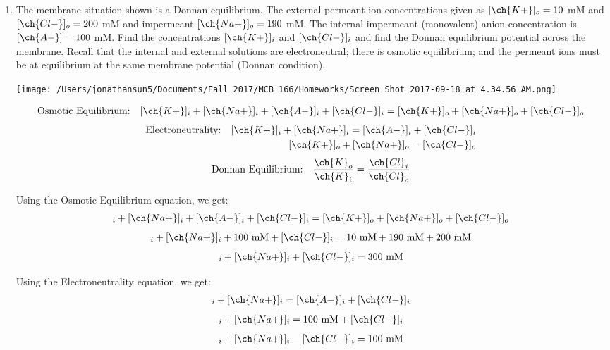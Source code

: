 \documentclass[11pt]{article}
\begin{document}
\begin{enumerate}[label=\arabic*.]
\newpage
\item
The membrane situation shown is a Donnan equilibrium. The external permeant ion concentrations given as $[\ch{K+}]_o = 10$ mM and $[\ch{Cl-}]_o = 200$ mM and impermeant $[\ch{Na+}]_o = 190$ mM. The internal impermeant (monovalent) anion concentration is $[\ch{A-}] = 100$ mM. Find the concentrations $[\ch{K+}]_i$ and $[\ch{Cl-}]_i$ and find the Donnan equilibrium potential across the membrane. Recall that the internal and external solutions are electroneutral; there is osmotic equilibrium; and the permeant ions must be at equilibrium at the same membrane potential (Donnan condition).
\begin{center}
\texttt{[image: /Users/jonathansun5/Documents/Fall 2017/MCB 166/Homeworks/Screen Shot 2017-09-18 at 4.34.56 AM.png]}
\end{center}
\begin{align*}
\text{Osmotic Equilibrium:} && [\ch{K+}]_i + [\ch{Na+}]_i + [\ch{A-}]_i + [\ch{Cl-}]_i = [\ch{K+}]_o + [\ch{Na+}]_o + [\ch{Cl-}]_o
\end{align*}
\begin{align*}
\text{Electroneutrality:} && [\ch{K+}]_i + [\ch{Na+}]_i = [\ch{A-}]_i + [\ch{Cl-}]_i \\
&& [\ch{K+}]_o + [\ch{Na+}]_o = [\ch{Cl-}]_o
\end{align*}
\begin{align*}
\text{Donnan Equilibrium:} &&  \frac{\ch{K}_o} {\ch{K}_i} = \frac{\ch{Cl}_i} {\ch{Cl}_o}
\end{align*}

Using the Osmotic Equilibrium equation, we get:
\begin{align*}
[\ch{K+}]_i + [\ch{Na+}]_i + [\ch{A-}]_i + [\ch{Cl-}]_i = [\ch{K+}]_o + [\ch{Na+}]_o + [\ch{Cl-}]_o
\end{align*}
\begin{align*}
[\ch{K+}]_i + [\ch{Na+}]_i + 100 \text{ mM} + [\ch{Cl-}]_i = 10 \text{ mM} + 190 \text{ mM} + 200 \text{ mM}
\end{align*}
\begin{align*}
[\ch{K+}]_i + [\ch{Na+}]_i + [\ch{Cl-}]_i = 300 \text{ mM}
\end{align*}

Using the Electroneutrality equation, we get:
\begin{align*}
[\ch{K+}]_i + [\ch{Na+}]_i = [\ch{A-}]_i + [\ch{Cl-}]_i
\end{align*}
\begin{align*}
[\ch{K+}]_i + [\ch{Na+}]_i = 100 \text{ mM} + [\ch{Cl-}]_i
\end{align*}
\begin{align*}
[\ch{K+}]_i + [\ch{Na+}]_i - [\ch{Cl-}]_i= 100 \text{ mM}
\end{align*}


\end{enumerate}
\end{document}
